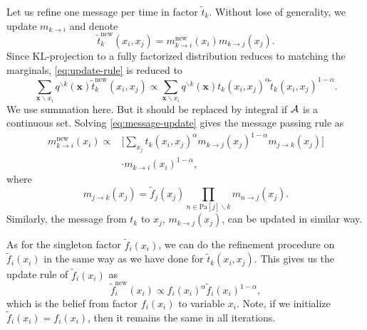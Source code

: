 \documentclass[conference]{IEEEtran}
\begin{document}
Let us refine one message per time in factor $\tilde{t}_k$. Without lose of generality, we update $m_{k\rightarrow i}$ and denote
\begin{equation}
  \tilde{t}_k^{\text{new}}(x_i, x_j) = m_{k\rightarrow i}^{\text{new}}(x_i) m_{k\rightarrow j}(x_j).
\end{equation}
Since KL-projection to a fully factorized distribution reduces to matching the marginals, \autoref{eq:update-rule} is reduced to
\begin{equation}\label{eq:message-update}
  \sum_{\bm{x}\backslash x_i} q^{\backslash k}(\bm{x}) \tilde{t}_k^{\text{new}}(x_i, x_j) \propto \sum_{\bm{x}\backslash x_i} q^{\backslash k}(\bm{x}) t_k(x_i, x_j)^{\alpha} \tilde{t}_k(x_i, x_j)^{1-\alpha}.
\end{equation}
We use summation here. But it should be replaced by integral if $\mathcal{A}$ is a continuous set.
Solving \autoref{eq:message-update} gives the message passing rule as
\begin{align}\label{eq:message-rule}
  {m}^{\text{new}}_{k\rightarrow i}(x_i) \propto & \bigg[ \sum_{x_j} t_k(x_i, x_j)^{\alpha} {m}_{k\rightarrow j}(x_j)^{1-\alpha} m_{j \rightarrow k}(x_j) \bigg] \nonumber \\
                                                 &\cdot m_{k\rightarrow i}(x_i)^{1-\alpha},
\end{align}
where
\begin{equation}
  m_{j \rightarrow k}(x_j) = \tilde{f}_j(x_j) \prod_{n \in \text{Pa}[j] \backslash k} m_{n \rightarrow j}(x_j).
\end{equation}
Similarly, the message from $t_k$ to $x_j$, $m_{k \rightarrow j}(x_j)$, can be updated in similar way.

As for the singleton factor $\tilde{f}_i(x_i)$, we can do the refinement procedure on $\tilde{f}_i(x_i)$ in the same way as we have done for $\tilde{t}_k(x_i, x_j)$. This gives us the update rule of $\tilde{f}_i(x_i)$ as
\begin{equation}\label{eq:fix-factor-update}
  \tilde{f}_i^{\text{new}}(x_i) \propto f_i(x_i)^{\alpha} \tilde{f}_i(x_i)^{1-\alpha},
\end{equation}
which is the belief from factor $f_i(x_i)$ to variable $x_i$. Note, if we initialize $\tilde{f}_i(x_i) = f_i(x_i)$, then it remains the same in all iterations.
\end{document}
